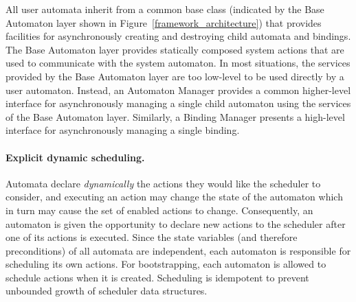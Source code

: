 
All user automata inherit from a common base class (indicated by the Base Automaton layer shown in Figure~\ref{framework_architecture}) that provides facilities for asynchronously creating and destroying child automata and bindings.
The Base Automaton layer provides statically composed system actions that are used to communicate with the system automaton.
In most situations, the services provided by the Base Automaton layer are too low-level to be used directly by a user automaton.
Instead, an Automaton Manager provides a common higher-level interface for asynchronously managing a single child automaton using the services of the Base Automaton layer.
Similarly, a Binding Manager presents a high-level interface for asynchronously managing a single binding.

\paragraph*{Explicit dynamic scheduling.}
Automata declare \emph{dynamically} the actions they would like the scheduler to consider, and executing an action may change the state of the automaton which in turn may cause the set of enabled actions to change.
Consequently, an automaton is given the opportunity to declare new actions to the scheduler after one of its actions is executed.
Since the state variables (and therefore preconditions) of all automata are independent, each automaton is responsible for scheduling its own actions.
For bootstrapping, each automaton is allowed to schedule actions when it is created.
Scheduling is idempotent to prevent unbounded growth of scheduler data structures.

